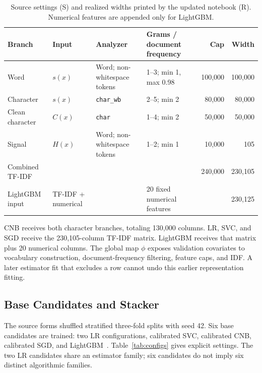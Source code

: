 \documentclass[doublecolumn]{ijcvsplatex}
\begin{document}
\begin{table}[t]
\small\centering
\caption{Source settings (S) and realized widths printed by the updated notebook (R). Numerical features are appended only for LightGBM.}
\label{tab:features}
\setlength{\tabcolsep}{4pt}
\begin{tabular}{llllrr}
\toprule
Branch & Input & Analyzer & Grams / document frequency & Cap & Width \\
\midrule
Word & $s(x)$ & Word; non-whitespace tokens & 1--3; min 1, max 0.98 & 100,000 & 100,000 \\
Character & $s(x)$ & \texttt{char\_wb} & 2--5; min 2 & 80,000 & 80,000 \\
Clean character & $C(x)$ & \texttt{char} & 1--4; min 2 & 50,000 & 50,000 \\
Signal & $H(x)$ & Word; non-whitespace tokens & 1--2; min 1 & 10,000 & 105 \\
\midrule
Combined TF-IDF & & & & 240,000 & 230,105 \\
LightGBM input & TF-IDF + numerical & & 20 fixed numerical features & & 230,125 \\
\bottomrule
\end{tabular}
\end{table}

CNB receives both character branches, totaling 130,000 columns. LR, SVC, and SGD receive the 230,105-column TF-IDF matrix. LightGBM receives that matrix plus 20 numerical columns. The global map $\phi$ exposes validation covariates to vocabulary construction, document-frequency filtering, feature caps, and IDF. A later estimator fit that excludes a row cannot undo this earlier representation fitting.

\subsection{Base Candidates and Stacker}
The source forms shuffled stratified three-fold splits with seed 42. Six base candidates are trained: two LR configurations, calibrated SVC, calibrated CNB, calibrated SGD, and LightGBM~\cite{ke2017lightgbm}. Table~\ref{tab:configs} gives explicit settings. The two LR candidates share an estimator family; six candidates do not imply six distinct algorithmic families.
\end{document}
